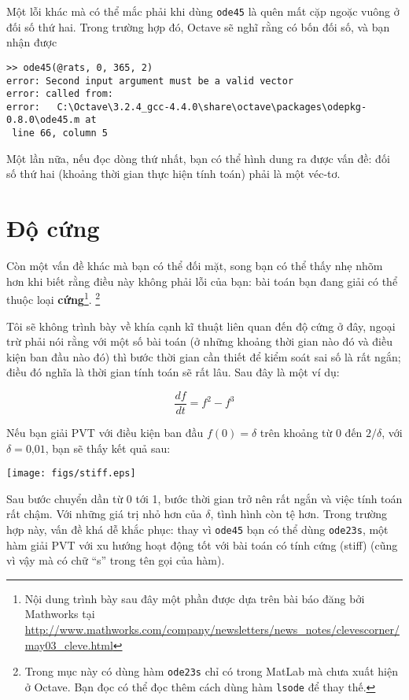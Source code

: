 \documentclass[12pt]{book}
\begin{document}
Một lỗi khác mà có thể mắc phải khi dùng {\tt ode45} là 
quên mất cặp ngoặc vuông ở đối số thứ hai. Trong trường hợp đó,
Octave sẽ nghĩ rằng có bốn đối số, và bạn nhận được

\begin{verbatim}
>> ode45(@rats, 0, 365, 2)
error: Second input argument must be a valid vector
error: called from:
error:   C:\Octave\3.2.4_gcc-4.4.0\share\octave\packages\odepkg-0.8.0\ode45.m at
 line 66, column 5
\end{verbatim}
%
Một lần nữa, nếu đọc dòng thứ nhất, bạn có thể hình dung ra
được vấn đề: đối số thứ hai (khoảng thời gian thực hiện tính toán)
phải là một véc-tơ.


\section{Độ cứng}

Còn một vấn đề khác mà bạn có thể đối mặt, song bạn có thể thấy
nhẹ nhõm hơn khi biết rằng điều này không phải lỗi của bạn: bài toán bạn
đang giải có thể thuộc loại {\bf cứng}\footnote{Nội dung trình bày
sau đây một phần được dựa trên bài báo đăng bởi Mathworks tại
\url{http://www.mathworks.com/company/newsletters/news_notes/clevescorner/may03_cleve.html}}.
\footnote{Trong mục này có dùng hàm \texttt{ode23s} chỉ có trong
MatLab mà chưa xuất hiện ở Octave. Bạn đọc có thể đọc thêm cách
dùng hàm \texttt{lsode} để thay thế.}

Tôi sẽ không trình bày về khía cạnh kĩ thuật liên quan đến độ cứng 
ở đây, ngoại trừ phải nói rằng với một số bài toán (ở những khoảng
thời gian nào đó và điều kiện ban đầu nào đó) thì bước thời gian cần thiết
để kiểm soát sai số là rất ngắn; điều đó nghĩa là thời gian tính toán
sẽ rất lâu. Sau đây là một ví dụ:

\[ \frac{df}{dt} = f^2 - f^3 \]

Nếu bạn giải PVT với điều kiện ban đầu  $f(0) = \delta$ trên khoảng
từ 0 đến $2/\delta$, với $\delta = \text{0,01}$, bạn sẽ thấy kết quả sau:

\centerline{\texttt{[image: figs/stiff.eps]}}

Sau bước chuyển dần từ 0 tới 1, bước thời gian trở nên rất ngắn
và việc tính toán rất chậm. Với những giá trị nhỏ hơn của $\delta$, 
tình hình còn tệ hơn.
Trong trường hợp này, vấn đề khá dễ khắc phục: thay vì {\tt ode45}
bạn có thể dùng {\tt ode23s}, một hàm giải PVT với xu hướng 
hoạt động tốt với bài toán có tính cứng (stiff) (cũng vì vậy mà có
chữ ``s'' trong tên gọi của hàm).
\end{document}
